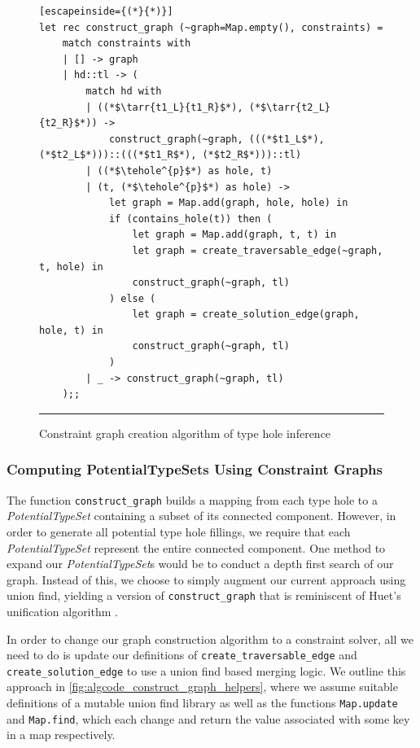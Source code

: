 \begin{figure}[hbt!]
\begin{lstlisting}[escapeinside={(*}{*)}]
let rec construct_graph (~graph=Map.empty(), constraints) =
    match constraints with
    | [] -> graph
    | hd::tl -> (
        match hd with
        | ((*$\tarr{t1_L}{t1_R}$*), (*$\tarr{t2_L}{t2_R}$*)) ->
            construct_graph(~graph, (((*$t1_L$*), (*$t2_L$*)))::(((*$t1_R$*), (*$t2_R$*)))::tl)
        | ((*$\tehole^{p}$*) as hole, t)
        | (t, (*$\tehole^{p}$*) as hole) ->
            let graph = Map.add(graph, hole, hole) in
            if (contains_hole(t)) then (
                let graph = Map.add(graph, t, t) in
                let graph = create_traversable_edge(~graph, t, hole) in
                construct_graph(~graph, tl)
            ) else (
                let graph = create_solution_edge(graph, hole, t) in
                construct_graph(~graph, tl)
            )
        | _ -> construct_graph(~graph, tl)
    );;

\end{lstlisting}
\vspace{-4px}
\hrule
\caption{Constraint graph creation algorithm of type hole inference}
\label{fig:algcode_construct_graph}
\end{figure}

\subsubsection{Computing PotentialTypeSets Using Constraint Graphs} 
The function \lstinline{construct_graph} builds a mapping from each type hole to a \emph{PotentialTypeSet} containing a subset of its connected component. However, in order to generate all potential type hole fillings, we require that each \emph{PotentialTypeSet} represent the entire connected component. One method to expand our \emph{PotentialTypeSet}s would be to conduct a depth first search of our graph. Instead of this, we choose to simply augment our current approach using union find, yielding a version of \lstinline{construct_graph} that is reminiscent of Huet's unification algorithm \cite{Huet}.

In order to change our graph construction algorithm to a constraint solver, all we need to do is update our definitions of \lstinline{create_traversable_edge} and \lstinline{create_solution_edge} to use a union find based merging logic. We outline this approach in \ref{fig:algcode_construct_graph_helpers}, where we assume suitable definitions of a mutable union find library as well as the functions \lstinline{Map.update} and \lstinline{Map.find}, which each change and return the value associated with some key in a map respectively.


